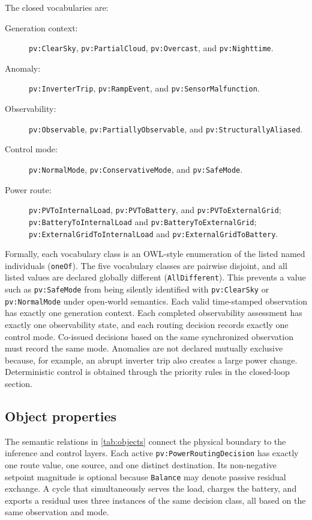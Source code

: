 \documentclass[
	letterpaper,
	10pt,
	unnumberedsections,
	twoside,
]{LTJournalArticle}
\newcommand{\pv}[1]{\texttt{pv:#1}}
\newcommand{\valueof}[1]{\texttt{pv:#1}}
\begin{document}
The closed vocabularies are:
\begin{description}
	\item[Generation context:] \valueof{ClearSky}, \valueof{PartialCloud}, \valueof{Overcast}, and \valueof{Nighttime}.
	\item[Anomaly:] \valueof{InverterTrip}, \valueof{RampEvent}, and \valueof{SensorMalfunction}.
	\item[Observability:] \valueof{Observable}, \valueof{PartiallyObservable}, and \valueof{StructurallyAliased}.
	\item[Control mode:] \valueof{NormalMode}, \valueof{ConservativeMode}, and \valueof{SafeMode}.
	\item[Power route:] \valueof{PVToInternalLoad}, \valueof{PVToBattery}, and \valueof{PVToExternalGrid};\newline
	\valueof{BatteryToInternalLoad} and \valueof{BatteryToExternalGrid};\newline
	\valueof{ExternalGridToInternalLoad} and \valueof{ExternalGridToBattery}.
\end{description}
Formally, each vocabulary class is an OWL-style enumeration of the listed named individuals (\texttt{oneOf}). The five vocabulary classes are pairwise disjoint, and all listed values are declared globally different (\texttt{AllDifferent}). This prevents a value such as \valueof{SafeMode} from being silently identified with \valueof{ClearSky} or \valueof{NormalMode} under open-world semantics.
Each valid time-stamped observation has exactly one generation context. Each completed observability assessment has exactly one observability state, and each routing decision records exactly one control mode. Co-issued decisions based on the same synchronized observation must record the same mode. Anomalies are not declared mutually exclusive because, for example, an abrupt inverter trip also creates a large power change. Deterministic control is obtained through the priority rules in the closed-loop section.

\subsection{Object properties}

The semantic relations in \autoref{tab:objects} connect the physical boundary to the inference and control layers. Each active \pv{PowerRoutingDecision} has exactly one route value, one source, and one distinct destination. Its non-negative setpoint magnitude is optional because \texttt{Balance} may denote passive residual exchange. A cycle that simultaneously serves the load, charges the battery, and exports a residual uses three instances of the same decision class, all based on the same observation and mode.
\end{document}
